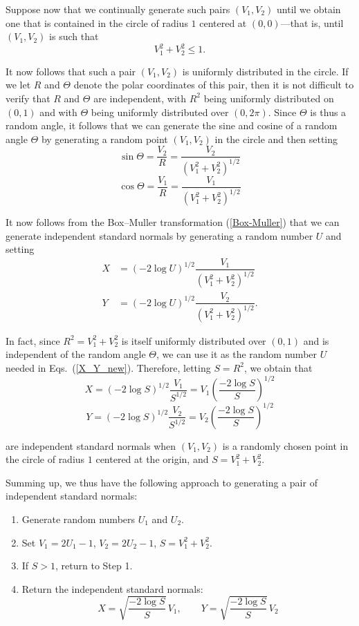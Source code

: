 \documentclass[11pt, a4paper]{article}
\begin{document}
Suppose now that we continually generate such pairs $(V_1, V_2)$ until we obtain one that is contained in the circle of radius $1$ centered at $(0,0)$---that is, until $(V_1, V_2)$ is such that
\[
V_1^2 + V_2^2 \leq 1.
\]

It now follows that such a pair $(V_1, V_2)$ is uniformly distributed in the circle. If we let $R$ and $\Theta$ denote the polar coordinates of this pair, then it is not difficult to verify that $R$ and $\Theta$ are independent, with $R^2$ being uniformly distributed on $(0,1)$ and with $\Theta$ being uniformly distributed over $(0, 2\pi)$. Since $\Theta$ is thus a random angle, it follows that we can generate the sine and cosine of a random angle $\Theta$ by generating a random point $(V_1, V_2)$ in the circle and then setting
\[
\sin \Theta = \dfrac{V_2}{R} = \dfrac{V_2}{\left(V_1^2 + V_2^2\right)^{1/2}}
\]
\[
\cos \Theta = \dfrac{V_1}{R} = \dfrac{V_1}{\left(V_1^2 + V_2^2\right)^{1/2}}
\]

It now follows from the Box--Muller transformation (\ref{Box-Muller}) that we can generate independent standard normals by generating a random number $U$ and setting
\begin{align}\label{X_Y_new}
X &= \left(-2 \log U \right)^{1/2} \dfrac{V_1}{\left(V_1^2 + V_2^2\right)^{1/2}} \nonumber \\[0.5em]
Y &= \left(-2 \log U \right)^{1/2} \dfrac{V_2}{\left(V_1^2 + V_2^2\right)^{1/2}}.
\end{align}

In fact, since $R^2 = V_1^2 + V_2^2$ is itself uniformly distributed over $(0,1)$ and is independent of the random angle $\Theta$, we can use it as the random number $U$ needed in Eqs.\ (\ref{X_Y_new}). Therefore, letting $S = R^2$, we obtain that
\[
X = \left(-2 \log S \right)^{1/2} \dfrac{V_1}{S^{1/2}} 
= V_1 \left( \dfrac{-2 \log S}{S} \right)^{1/2}
\]
\[
Y = \left(-2 \log S \right)^{1/2} \dfrac{V_2}{S^{1/2}} 
= V_2 \left( \dfrac{-2 \log S}{S} \right)^{1/2}
\]

are independent standard normals when $(V_1, V_2)$ is a randomly chosen point in the circle of radius $1$ centered at the origin, and $S = V_1^2 + V_2^2$.

Summing up, we thus have the following approach to generating a pair of independent standard normals:

\begin{enumerate}[STEP 1:]
\item Generate random numbers $U_1$ and $U_2$.
    
\item Set $V_1 = 2U_1 - 1$, \quad $V_2 = 2U_2 - 1$, \quad $S = V_1^2 + V_2^2$.
    
\item If $S > 1$, return to Step 1.
    
\item Return the independent standard normals:
    \[
    X = \sqrt{\dfrac{-2 \log S}{S}}\, V_1, 
    \qquad
    Y = \sqrt{\dfrac{-2 \log S}{S}}\, V_2
    \]
\end{enumerate}
\end{document}
